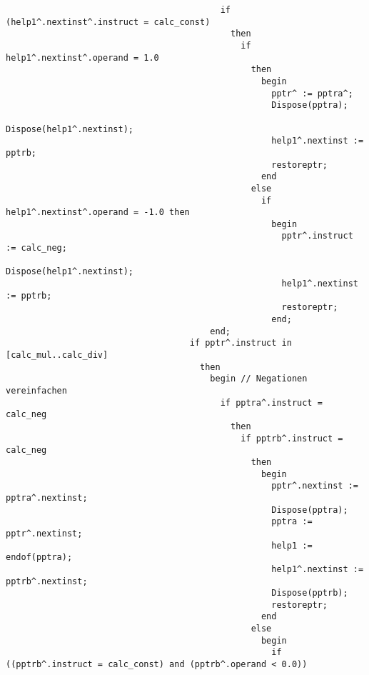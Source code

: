\begin{refsection}
\begin{lstlisting}
                                          if (help1^.nextinst^.instruct = calc_const)
                                            then
                                              if help1^.nextinst^.operand = 1.0
                                                then
                                                  begin
                                                    pptr^ := pptra^;
                                                    Dispose(pptra);
                                                    Dispose(help1^.nextinst);
                                                    help1^.nextinst := pptrb;
                                                    restoreptr;
                                                  end
                                                else
                                                  if help1^.nextinst^.operand = -1.0 then
                                                    begin
                                                      pptr^.instruct := calc_neg;
                                                      Dispose(help1^.nextinst);
                                                      help1^.nextinst := pptrb;
                                                      restoreptr;
                                                    end;
                                        end;
                                    if pptr^.instruct in [calc_mul..calc_div]
                                      then
                                        begin // Negationen vereinfachen
                                          if pptra^.instruct = calc_neg
                                            then
                                              if pptrb^.instruct = calc_neg
                                                then
                                                  begin
                                                    pptr^.nextinst := pptra^.nextinst;
                                                    Dispose(pptra);
                                                    pptra := pptr^.nextinst;
                                                    help1 := endof(pptra);
                                                    help1^.nextinst := pptrb^.nextinst;
                                                    Dispose(pptrb);
                                                    restoreptr;
                                                  end
                                                else
                                                  begin
                                                    if ((pptrb^.instruct = calc_const) and (pptrb^.operand < 0.0))

\end{lstlisting}
\end{refsection}
